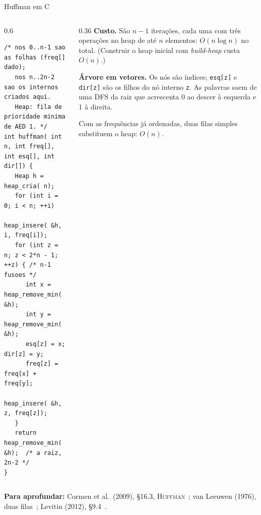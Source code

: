 \documentclass[aspectratio=169,xcolor=table]{beamer}
\newcommand{\fonte}[1]{%
  \vfill
  {\tiny\color{gray!55!black}\textbf{Para aprofundar:} #1\par}%
}
\begin{document}
\begin{frame}[fragile]{Huffman em C}
  \begin{columns}[T]
    \begin{column}{0.6\textwidth}
\begin{lstlisting}[basicstyle=\ttfamily\tiny]
/* nos 0..n-1 sao as folhas (freq[] dado);
   nos n..2n-2 sao os internos criados aqui.
   Heap: fila de prioridade minima de AED 1. */
int huffman( int n, int freq[], int esq[], int dir[]) {
   Heap h = heap_cria( n);
   for (int i = 0; i < n; ++i)
      heap_insere( &h, i, freq[i]);
   for (int z = n; z < 2*n - 1; ++z) { /* n-1 fusoes */
      int x = heap_remove_min( &h);
      int y = heap_remove_min( &h);
      esq[z] = x;  dir[z] = y;
      freq[z] = freq[x] + freq[y];
      heap_insere( &h, z, freq[z]);
   }
   return heap_remove_min( &h);  /* a raiz, 2n-2 */
}
\end{lstlisting}
    \end{column}
    \begin{column}{0.36\textwidth}
      \scriptsize
      \textbf{Custo.} São $n - 1$ iterações, cada uma com três operações no heap de até
      $n$ elementos: $O(n \log n)$ no total. (Construir o heap inicial com
      \textit{build-heap} custa $O(n)$.)
      \medskip

      \textbf{Árvore em vetores.} Os nós são índices; \texttt{esq[z]} e \texttt{dir[z]}
      são os filhos do nó interno \texttt{z}. As palavras saem de uma DFS da raiz que
      acrescenta 0 ao descer à esquerda e 1 à direita.
      \medskip

      Com as frequências já ordenadas, duas filas simples substituem o heap: $O(n)$.
    \end{column}
  \end{columns}
  \fonte{Cormen et al.\ (2009), \S 16.3, \textsc{Huffman}~\cite{cormen2009introduction}; van Leeuwen (1976), duas filas~\cite{vanleeuwen1976construction};
    Levitin (2012), \S 9.4~\cite{levitin2012introduction}.}
\end{frame}
\end{document}
